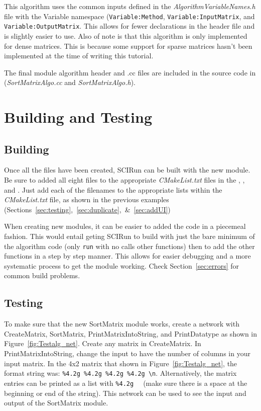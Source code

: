 \documentclass[fleqn,11pt,openany]{book}
\begin{document}
This algorithm uses the common inputs defined in the \emph{AlgorithmVariableNames.h} file with the Variable namespace (\verb|Variable:Method|, \verb|Variable:InputMatrix|, and \verb|Variable:OutputMatrix|.  
This allows for fewer declarations in the header file and is slightly easier to use.  
Also of note is that this algorithm is only implemented for dense matrices.
This is because some support for sparse matrices hasn't been implemented at the time of writing this tutorial. 

The final module algorithm header and .cc files are included in the source code in \emph{} (\emph{SortMatrixAlgo.cc} and \emph{SortMatrixAlgo.h}).

\section{Building and Testing}
\label{sec:algo_building}

\subsection{Building}

Once all the files have been created, SCIRun can be built with the new module.  
Be sure to added all eight files to the appropriate \emph{CMakeList.txt} files in the \emph{}, \emph{}, and \emph{}.  
Just add each of the filenames to the appropriate lists within the \emph{CMakeList.txt} file, as shown in the previous examples (Sections~\ref{sec:testing},~\ref{sec:duplicate},~\&~\ref{sec:addUI})

When creating new modules, it can be easier to added the code in a piecemeal fashion.
This would entail geting SCIRun to build with just the bare minimum of the algorithm code (only \verb|run| with no calls other functions) then to add the other functions in a step by step manner.  
This allows for easier debugging and a more systematic process to get the module working.  
Check Section~\ref{sec:errors} for common build problems.

\subsection{Testing}

To make sure that the new SortMatrix module works, create a network with CreateMatrix, SortMatrix, PrintMatrixIntoString, and PrintDatatype as shown in Figure~\ref{fig:Testalg_net}.  
Create any matrix in CreateMatrix.
In PrintMatrixIntoString, change the input to have the number of columns in your input matrix.
In the 4x2 matrix that shown in Figure~\ref{fig:Testalg_net}, the format string was: \verb|%4.2g %4.2g %4.2g %4.2g \n|.
Alternatively, the matrix entries can be printed as a list with \verb|%4.2g  | (make sure there is a space at the beginning or end of the string).
This network can be used to see the input and output of the SortMatrix module.  
\end{document}
